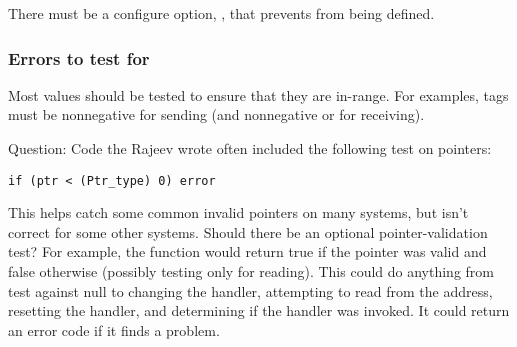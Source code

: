 \documentclass{article}
\begin{document}
There must be a configure option,
,  
that prevents  from being defined.

\subsubsection{Errors to test for}
Most values should be tested to ensure that they are in-range.  For examples,
tags must be nonnegative for sending (and nonnegative or
 for receiving). 

Question: Code the Rajeev wrote often included the following test on pointers:
\begin{verbatim}
if (ptr < (Ptr_type) 0) error
\end{verbatim}
This helps catch some common invalid pointers on many systems, but isn't
correct for some other systems.  Should there be an optional
pointer-validation test?  For example, the function
 would return true if the pointer was valid and
false otherwise (possibly testing only for reading).  This could do anything
from test against null to changing the  handler, attempting to
read from the address, resetting the handler, and determining if the handler
was invoked.  It could return an error code if it finds a problem.
\end{document}
